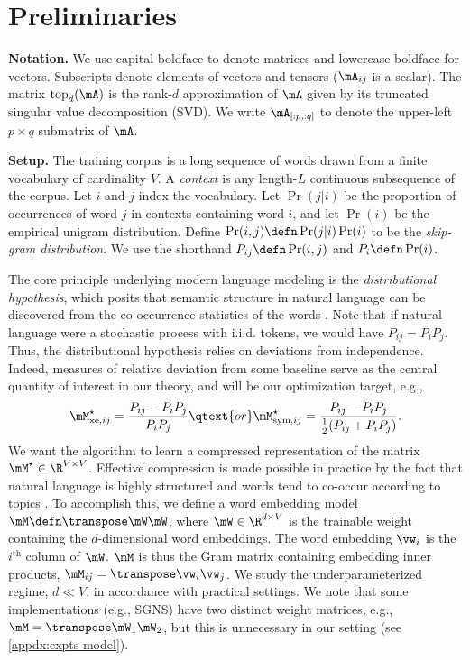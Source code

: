 \section{Preliminaries}

\textbf{Notation.} We use capital boldface to denote matrices and lowercase boldface for vectors. Subscripts denote elements of vectors and tensors ($\mA_{ij}$ is a scalar). The matrix $\mathrm{top}_d(\mA)$ is the rank-$d$ approximation of $\mA$ given by its truncated singular value decomposition (SVD).
We write $\mA_{[:p,:q]}$ to denote the upper-left $p\times q$ submatrix of $\mA$.

\textbf{Setup.} The training corpus is a long sequence of words drawn from a finite vocabulary of cardinality $V$. A \textit{context} is any length-$L$ continuous subsequence of the corpus. Let $i$ and $j$ index the vocabulary.
Let $\Pr(j|i)$ be the proportion of occurrences of word $j$ in contexts containing word $i$,
and let $\Pr(i)$ be the empirical unigram distribution. Define $\Pr(i,j)\defn \Pr(j|i)\Pr(i)$ to be the \textit{skip-gram distribution}. We use the shorthand $P_{ij}\defn \Pr(i,j)$ and $P_i\defn \Pr(i)$. 

The core principle underlying modern language modeling is the \textit{distributional hypothesis}, which posits that semantic structure in natural language can be discovered from the co-occurrence statistics of the words \citep{harris1954distributional}. Note that if natural language were a stochastic process with i.i.d. tokens, we would have $P_{ij}=P_i P_j$. Thus, the distributional hypothesis relies on deviations from independence. Indeed, measures of relative deviation from some baseline serve as the central quantity of interest in our theory, and will be our optimization target, e.g.,
\begin{equation*}
    \Mstarxeij = \frac{P_{ij} - P_i P_j}{P_i P_j} \qtext{or} \Mstarsymij = \frac{P_{ij} - P_i P_j}{\frac{1}{2}(P_{ij}+P_i P_j)}.
\end{equation*}
We want the algorithm to learn a compressed representation of the matrix $\Mstar\in\R^{V\times V}$. Effective compression is made possible in practice by the fact that natural language is highly structured and words tend to co-occur according to topics \citep{arora2016latent}.
To accomplish this, we define a word embedding model $\M\defn \T\mW\mW$, where $\mW\in\R^{d\times V}$ is the trainable weight containing the $d$-dimensional word embeddings. The word embedding $\vw_i$ is the $i^\text{th}$ column of $\mW$. $\M$ is thus the Gram matrix containing embedding inner products, $\M_{ij}=\T\vw_{i}\vw_{j}$.  We study the underparameterized regime, $d\ll V$, in accordance with practical settings. We note that some implementations (e.g., SGNS) have two distinct weight matrices, e.g., $\M=\T\mW_1\mW_2$, but this is unnecessary in our setting (see \cref{appdx:expts-model}).

